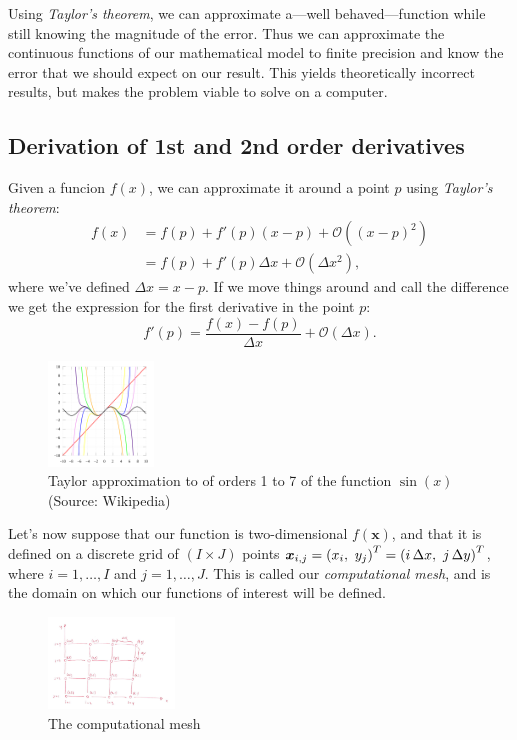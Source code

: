 \documentclass[acmtog]{acmart}
\begin{document}
Using \textit{Taylor's theorem}, we can approximate a---well behaved---function
while still knowing the magnitude of the error. Thus we can approximate the
continuous functions of our mathematical model to finite precision and know the
error that we should expect on our result. This yields theoretically incorrect
results, but makes the problem viable to solve on a computer.

\subsection{Derivation of 1st and 2nd order derivatives}
Given a funcion $f(x)$, we can approximate it around a point $p$ using
\textit{Taylor's theorem}:
%
\begin{align}
  f(x) & = f(p) + f'(p)(x - p) + \mathcal{O}\left((x - p)^2\right) \\
       & = f(p) + f'(p)\Delta x + \mathcal{O}(\Delta x^2),
\end{align}
%
where we've defined $\Delta x = x - p$. If we move things around and call the
difference we get the expression for the first derivative in the point $p$:
%
\begin{equation}
  f'(p) = \frac{f(x) - f(p)}{\Delta x} + \mathcal{O}(\Delta x).
  \label{eq:taylordiff}
\end{equation}
%
\begin{figure}[H]
  \centering
  \includegraphics[width=0.25\textwidth]{Images/taylor.png}
  \caption{Taylor approximation to of orders 1 to 7 of the function $\sin(x)$ (Source: Wikipedia)}
  \Description{}
\end{figure}

Let's now suppose that our function is two-dimensional $f(\boldsymbol x)$, and
that it is defined on a discrete grid of $(I\times J)$ points $\boldsymbol
  x_{i,j} = \qty(x_i, \ y_j)^T = \qty(i \, \Delta x, \ j \, \Delta y)^T$, where
$i = 1, \dots, I$ and $j = 1, \dots, J$. This is called our
\textit{computational mesh}, and is the domain on which our functions of
interest will be defined.

\begin{figure}[H]
  \centering
  \includegraphics[width=0.3\textwidth]{Images/computational mesh.png}
  \caption{The computational mesh}
  \Description{}
\end{figure}
\end{document}
